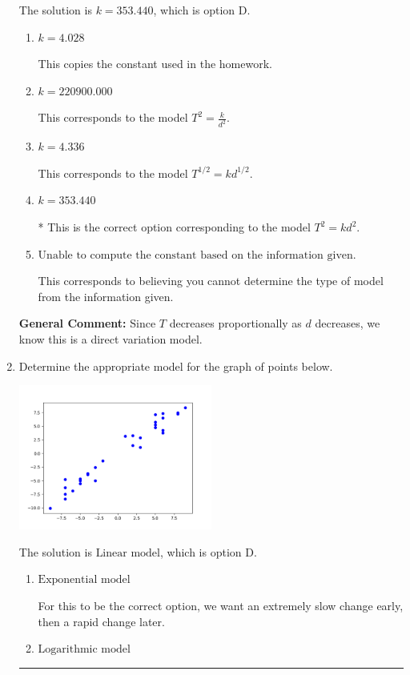 \documentclass{extbook}[14pt]
\newcommand{\litem}[1]{\item #1

\rule{\textwidth}{0.4pt}}
\begin{document}
\begin{enumerate}
{The solution is \( k = 353.440 \), which is option D.\begin{enumerate}[label=\Alph*.]
\item \( k = 4.028 \)

This copies the constant used in the homework.
\item \( k = 220900.000 \)

This corresponds to the model $T^{2} = \frac{k}{d^{2}}$.
\item \( k = 4.336 \)

This corresponds to the model $T^{1/2} = k d^{1/2}$.
\item \( k = 353.440 \)

* This is the correct option corresponding to the model $T^{2} = k d^{2}$.
\item \( \text{Unable to compute the constant based on the information given.} \)

This corresponds to believing you cannot determine the type of model from the information given.
\end{enumerate}

\textbf{General Comment:} Since $T$ decreases proportionally as $d$ decreases, we know this is a direct variation model.
}
\litem{
Determine the appropriate model for the graph of points below.

\begin{center}
    \includegraphics[width=0.5\textwidth]{../Figures/identifyModelGraph12A.png}
\end{center}




The solution is \( \text{Linear model} \), which is option D.\begin{enumerate}[label=\Alph*.]
\item \( \text{Exponential model} \)

For this to be the correct option, we want an extremely slow change early, then a rapid change later.
\item \( \text{Logarithmic model} \)


\end{enumerate}}
\end{enumerate}
\end{document}
